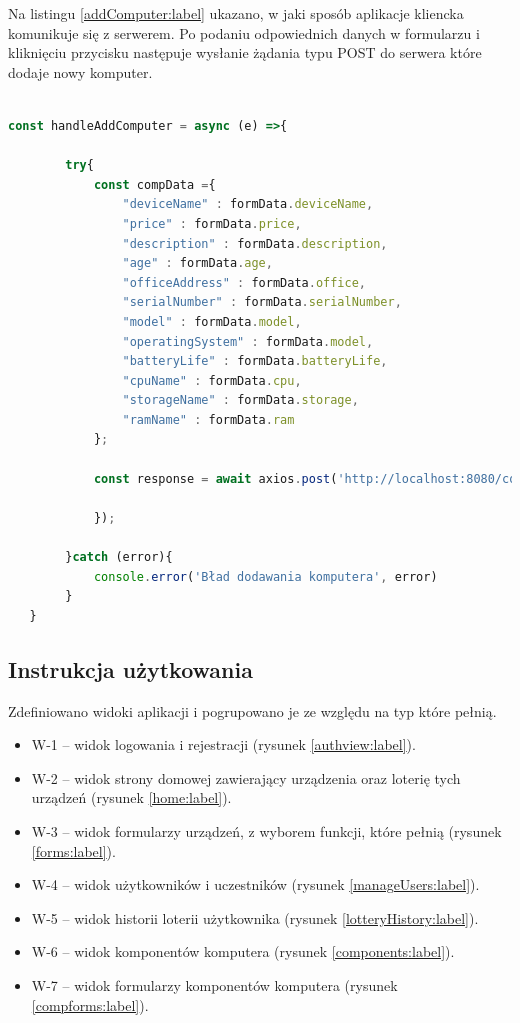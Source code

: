 Na listingu \ref{addComputer:label} ukazano, w jaki sposób aplikacje kliencka komunikuje się z serwerem. Po podaniu odpowiednich danych w formularzu i kliknięciu przycisku następuje wysłanie żądania typu POST do serwera które dodaje nowy komputer. 
\begin{lstlisting}[language=JavaScript, style=JavaScriptStyle,  caption={Przykładowe zapytanie do serwera dla formularza komputera}, label={addComputer:label}]

const handleAddComputer = async (e) =>{

        try{
            const compData ={
                "deviceName" : formData.deviceName,
                "price" : formData.price,
                "description" : formData.description,
                "age" : formData.age,
                "officeAddress" : formData.office,
                "serialNumber" : formData.serialNumber,
                "model" : formData.model,
                "operatingSystem" : formData.model,
                "batteryLife" : formData.batteryLife,
                "cpuName" : formData.cpu,
                "storageName" : formData.storage,
                "ramName" : formData.ram
            };

            const response = await axios.post('http://localhost:8080/computers/add', compData, {

            });

        }catch (error){
            console.error('Bład dodawania komputera', error)
        }
   }
\end{lstlisting}


\subsection{Instrukcja użytkowania}
Zdefiniowano widoki aplikacji i pogrupowano je ze względu na typ które pełnią.
\begin{itemize}
	\item W-1 -- widok logowania i rejestracji (rysunek \ref{authview:label}).
	\item W-2 -- widok strony domowej zawierający urządzenia oraz loterię tych urządzeń (rysunek \ref{home:label}).
	\item W-3 -- widok formularzy urządzeń, z wyborem funkcji, które pełnią (rysunek \ref{forms:label}).
	\item W-4 -- widok użytkowników i uczestników (rysunek \ref{manageUsers:label}).
	\item W-5 -- widok historii loterii użytkownika (rysunek \ref{lotteryHistory:label}).
	\item W-6 -- widok komponentów komputera (rysunek \ref{components:label}).
	\item W-7 -- widok formularzy komponentów komputera (rysunek \ref{compforms:label}).
\end{itemize} 

